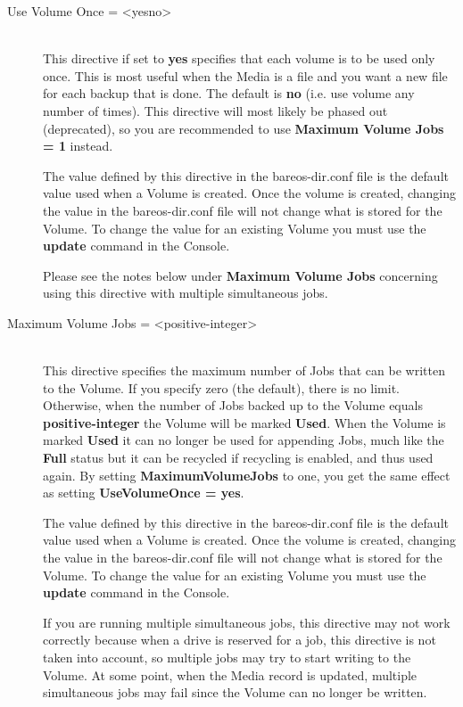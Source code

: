 \begin{description}
\item [Use Volume Once = {\textless}yes{\textbar}no{\textgreater}] \hfill \\
This directive if set to {\bf yes} specifies that each volume is to be
used only once.  This is most useful when the Media is a file and you
want a new file for each backup that is done.  The default is {\bf no}
(i.e.  use volume any number of times).  This directive will most likely
be phased out (deprecated), so you are recommended to use {\bf Maximum
Volume Jobs = 1} instead.

The value defined by this directive in the bareos-dir.conf file is the
default value used when a Volume is created.  Once the volume is
created, changing the value in the bareos-dir.conf file will not change
what is stored for the Volume.  To change the value for an existing
Volume you must use the {\bf update} command in the Console.

Please see the notes below under {\bf Maximum Volume Jobs} concerning
using this directive with multiple simultaneous jobs.

\item [Maximum Volume Jobs = {\textless}positive-integer{\textgreater}] \hfill \\
This directive specifies the maximum number of Jobs that can be written
to the Volume.  If you specify zero (the default), there is no limit.
Otherwise, when the number of Jobs backed up to the Volume equals {\bf
positive-integer} the Volume will be marked {\bf Used}.  When the Volume
is marked {\bf Used} it can no longer be used for appending Jobs, much
like the {\bf Full} status but it can be recycled if recycling is
enabled, and thus used again.  By setting {\bf MaximumVolumeJobs} to
one, you get the same effect as setting {\bf UseVolumeOnce = yes}.

The value defined by this directive in the  bareos-dir.conf
file is the default value used when a Volume  is created. Once the volume is
created, changing the value  in the bareos-dir.conf file will not change what
is stored  for the Volume. To change the value for an existing Volume  you
must use the {\bf update} command in the Console.

If you are running multiple simultaneous jobs, this directive may not
work correctly because when a drive is reserved for a job, this
directive is not taken into account, so multiple jobs may try to
start writing to the Volume. At some point, when the Media record is
updated, multiple simultaneous jobs may fail since the Volume can no
longer be written.


\end{description}
